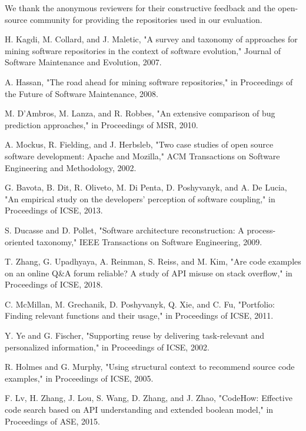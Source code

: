 \documentclass[conference]{IEEEtran}
\begin{document}
We thank the anonymous reviewers for their constructive feedback and the open-source community for providing the repositories used in our evaluation.

\begin{thebibliography}{1}

H. Kagdi, M. Collard, and J. Maletic, "A survey and taxonomy of approaches for mining software repositories in the context of software evolution," Journal of Software Maintenance and Evolution, 2007.

A. Hassan, "The road ahead for mining software repositories," in Proceedings of the Future of Software Maintenance, 2008.

M. D'Ambros, M. Lanza, and R. Robbes, "An extensive comparison of bug prediction approaches," in Proceedings of MSR, 2010.

A. Mockus, R. Fielding, and J. Herbsleb, "Two case studies of open source software development: Apache and Mozilla," ACM Transactions on Software Engineering and Methodology, 2002.

G. Bavota, B. Dit, R. Oliveto, M. Di Penta, D. Poshyvanyk, and A. De Lucia, "An empirical study on the developers' perception of software coupling," in Proceedings of ICSE, 2013.

S. Ducasse and D. Pollet, "Software architecture reconstruction: A process-oriented taxonomy," IEEE Transactions on Software Engineering, 2009.

T. Zhang, G. Upadhyaya, A. Reinman, S. Reiss, and M. Kim, "Are code examples on an online Q&A forum reliable? A study of API misuse on stack overflow," in Proceedings of ICSE, 2018.

C. McMillan, M. Grechanik, D. Poshyvanyk, Q. Xie, and C. Fu, "Portfolio: Finding relevant functions and their usage," in Proceedings of ICSE, 2011.

Y. Ye and G. Fischer, "Supporting reuse by delivering task-relevant and personalized information," in Proceedings of ICSE, 2002.

R. Holmes and G. Murphy, "Using structural context to recommend source code examples," in Proceedings of ICSE, 2005.

F. Lv, H. Zhang, J. Lou, S. Wang, D. Zhang, and J. Zhao, "CodeHow: Effective code search based on API understanding and extended boolean model," in Proceedings of ASE, 2015.


\end{thebibliography}
\end{document}
